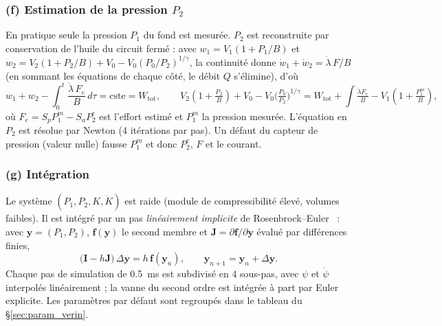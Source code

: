 \documentclass[11pt,a4paper]{article}
\newcommand{\vect}[1]{\bm{#1}}
\newcommand{\mat}[1]{\bm{#1}}
\newcommand{\dt}[1]{\dot{#1}}
\begin{document}
\subsubsection*{(f) Estimation de la pression $P_2$}
En pratique seule la pression $P_1$ du fond est mesurée. $P_2$ est reconstruite par conservation de l'huile du circuit fermé : avec $w_1=V_1(1+P_1/B)$ et $w_2=V_2(1+P_2/B)+V_0-V_0(P_0/P_2)^{1/\gamma}$, la continuité donne $\dt w_1+\dt w_2=\dt\lambda\,F/B$ (en sommant les équations de chaque côté, le débit $Q$ s'élimine), d'où
\begin{equation}
 w_1+w_2-\int_0^t\frac{\dt\lambda\,F_e}{B}\,d\tau=\text{cste}=W_{\text{tot}},\qquad
 V_2(1+\tfrac{P_2}{B})+V_0-V_0\Big(\tfrac{P_0}{P_2}\Big)^{1/\gamma}=W_{\text{tot}}+\!\int\!\tfrac{\dt\lambda F_e}{B}-V_1(1+\tfrac{P_1^m}B),
\end{equation}
où $F_e=S_pP_1^m-S_aP_2^e$ est l'effort estimé et $P_1^m$ la pression mesurée. L'équation en $P_2$ est résolue par Newton (4 itérations par pas). Un défaut du capteur de pression (valeur nulle) fausse $P_1^m$ et donc $P_2^e$, $F$ et le courant.

\subsubsection*{(g) Intégration}
Le système $(P_1,P_2,K,\dt K)$ est raide (module de compressibilité élevé, volumes faibles). Il est intégré par un pas \emph{linéairement implicite} de Rosenbrock--Euler~\cite{Hairer1996} : avec $\vect y=(P_1,P_2)$, $\vect f(\vect y)$ le second membre et $\mat J=\partial\vect f/\partial\vect y$ évalué par différences finies,
\begin{equation}
 \big(\mat I-h\mat J\big)\,\Delta\vect y=h\,\vect f(\vect y_n),\qquad\vect y_{n+1}=\vect y_n+\Delta\vect y.
\end{equation}
Chaque pas de simulation de \SI{0,5}{ms} est subdivisé en $4$ sous-pas, avec $\psi$ et $\dt\psi$ interpolés linéairement ; la vanne du second ordre est intégrée à part par Euler explicite. Les paramètres par défaut sont regroupés dans le tableau du §\ref{sec:param_verin}.
\end{document}

